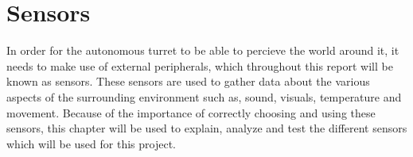 \chapter{Sensors}\label{sensors}
In order for the autonomous turret to be able to percieve the world around it,
it needs to make use of external peripherals, which throughout this report will
be known as sensors. These sensors are used to gather data about the various
aspects of the surrounding environment such as, sound, visuals, temperature and
movement. Because of the importance of correctly choosing and using these
sensors, this chapter will be used to explain, analyze and test the different
sensors which will be used for this project.

 

